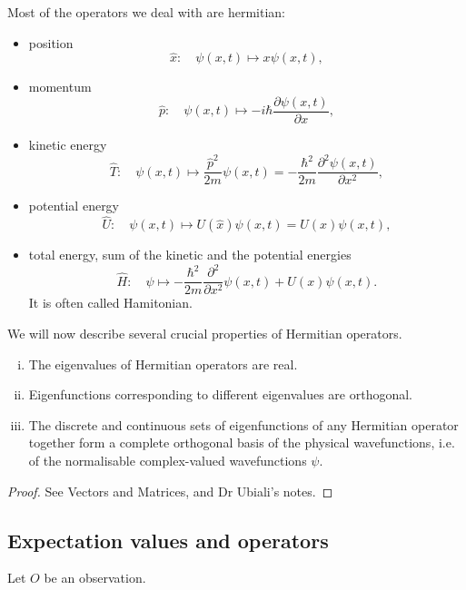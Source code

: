\documentclass[a4paper,11pt]{article}
\begin{document}
Most of the operators we deal with are hermitian: 
\begin{example}
    \begin{itemize}
        \item position
        \[
        \hat{x}: \quad \psi(x, t) \mapsto x \psi(x, t),
        \]
        \item momentum
        \[
        \hat{p}: \quad \psi(x, t) \mapsto-i \hbar \frac{\partial \psi(x, t)}{\partial x} ,
        \]
        \item kinetic energy
        \[
        \hat{T}: \quad \psi(x, t) \mapsto \frac{\hat{p}^2}{2 m} \psi(x, t)=-\frac{\hbar^2}{2 m} \frac{\partial^2 \psi(x, t)}{\partial x^2},
        \]
        \item potential energy
        \[
        \hat{U}: \quad \psi(x, t) \mapsto U(\hat{x}) \psi(x, t)=U(x) \psi(x, t),
        \]
        \item total energy, sum of the kinetic and the potential energies
        \[
        \hat{H}: \quad \psi \mapsto-\frac{\hbar^2}{2 m} \frac{\partial^2}{\partial x^2} \psi(x, t)+U(x) \psi(x, t) .
        \]
        It is often called Hamitonian. 
    \end{itemize}
\end{example}

We will now describe several crucial properties of Hermitian operators.

\begin{theorem}\label{thm:2.6}
    \begin{enumerate}[(i)]
        \item The eigenvalues of Hermitian operators are real. 
        \item Eigenfunctions corresponding to different eigenvalues are orthogonal. 
        \item The discrete and continuous sets of eigenfunctions of any Hermitian operator together form a complete orthogonal basis of the physical wavefunctions, i.e. of the normalisable complex-valued wavefunctions $ \psi $. 
    \end{enumerate}
\end{theorem}
\begin{proof}
    See Vectors and Matrices, and Dr Ubiali's notes. 
\end{proof}

\subsection{Expectation values and operators}
Let $O$ be an observation. 
\end{document}
